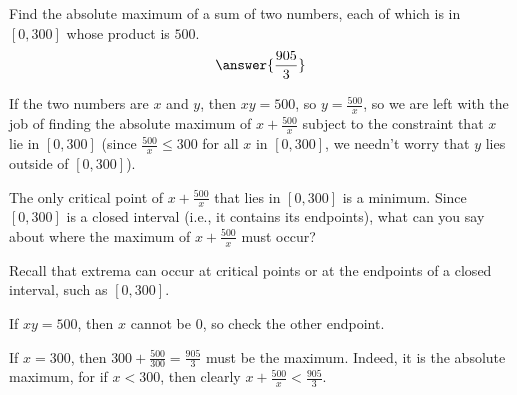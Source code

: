 \documentclass{ximera}
\author{Gregory Hartman \and Matthew Carr}
\begin{document}
\begin{exercise}



Find the absolute maximum of a sum of two numbers, each of which is in $[0,300]$ whose product is $500$.\[\answer{\frac{905}{3}}\]

\begin{hint}
If the two numbers are $x$ and $y$, then $xy=500$, so $y=\frac{500}{x}$, so we are left with the job of finding the absolute maximum of $x+\frac{500}{x}$ subject to the constraint that $x$ lie in $[0,300]$ (since $\frac{500}{x}\le300$ for all $x$ in $[0,300]$, we needn't worry that $y$ lies outside of $[0,300]$).
\end{hint}
\begin{hint}
The only critical point of $x+\frac{500}{x}$ that lies in $[0,300]$ is a minimum. Since $[0,300]$ is a closed interval (i.e., it contains its endpoints), what can you say about where the maximum of $x+\frac{500}{x}$ must occur?
\end{hint}
\begin{hint}
Recall that extrema can occur at critical points or at the endpoints of a closed interval, such as $[0,300]$. 
\end{hint}
\begin{hint}
If $xy=500$, then $x$ cannot be $0$, so check the other endpoint.
\end{hint}
\begin{hint}
If $x=300$, then $300+\frac{500}{300}=\frac{905}{3}$ must be the maximum. Indeed, it is the absolute maximum, for if $x<300$, then clearly $x+\frac{500}{x}<\frac{905}{3}$.
\end{hint}
\end{exercise}
\end{document}
